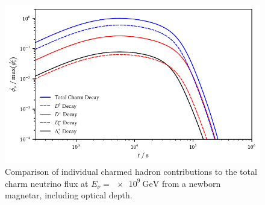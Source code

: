 \begin{figure}[H]
	\centering
	\includegraphics{../plots/build/magnetar_charm_decay_comparison_with.pdf}
	\caption[Magnetar $\nu \kern+0.5pt$ flux from $c$ decay including optical depth.]
			{Comparison of individual charmed hadron contributions to the total charm neutrino flux at
			 $E_\nu = \qty{e9}{\giga\electronvolt}$ from a newborn magnetar, including optical depth.}
	\label{fig:magnetar-charm-comparison-with}
\end{figure}
